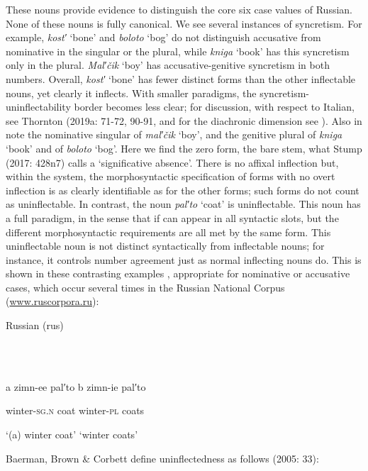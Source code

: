 \documentclass[output=paper]{langscibook}
\begin{document}
These nouns provide evidence to distinguish the core six case values of Russian. None of these nouns is fully canonical. We see several instances of syncretism. For example, \textit{kost′} ‘bone’ and \textit{boloto} ‘bog’ do not distinguish accusative from nominative in the singular or the plural, while \textit{kniga} ‘book’ has this syncretism only in the plural. \textit{Mal′čik} ‘boy’ has accusative-genitive syncretism in both numbers. Overall, \textit{kost′} ‘bone’ has fewer distinct forms than the other inflectable nouns, yet clearly it inflects. With smaller paradigms, the syncretism-uninflectability border becomes less clear; for discussion, with respect to Italian, see Thornton (2019a: 71-72, 90-91, and for the diachronic dimension see \citealt{Loporcaro2011}). Also in  note the nominative singular of \textit{mal′čik} ‘boy’, and the genitive plural of \textit{kniga} ‘book’ and of \textit{boloto} ‘bog’. Here we find the zero form, the bare stem, what Stump (2017: 428n7) calls a ‘significative absence’. There is no affixal inflection but, within the system, the morphosyntactic specification of forms with no overt inflection is as clearly identifiable as for the other forms; such forms do not count as uninflectable. In contrast, the noun \textit{pal′to} ‘coat’ is uninflectable. This noun has a full paradigm, in the sense that if can appear in all syntactic slots, but the different morphosyntactic requirements are all met by the same form. This uninflectable noun is not distinct syntactically from inflectable nouns; for instance, it controls number agreement just as normal inflecting nouns do. This is shown in these contrasting examples , appropriate for nominative or accusative cases, which occur several times in the Russian National Corpus (\href{http://www.ruscorpora.ru}{{www.ruscorpora.ru}}{)}:

Russian (rus)

\ea%
    \label{ex:key:3}
    \gll \\
         \\
    \glt
    \z %

        a  zimn-ee  pal′to  b  zimn-ie  pal′to

  winter-\textsc{sg.n}  coat    winter-\textsc{pl}  coats

  ‘(a) winter coat’  ‘winter coats’

Baerman, Brown \& Corbett define uninflectedness as follows (2005: 33):
\end{document}
